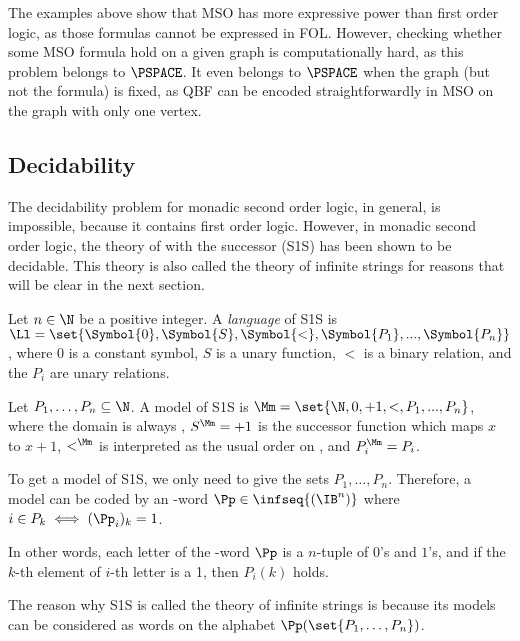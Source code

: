 The examples above show that MSO has more expressive power than first
order logic, as those formulas cannot be expressed in FOL.
However, checking whether some MSO formula hold on a given graph
is computationally hard, as this problem belongs to $\PSPACE$.
It even belongs to $\PSPACE$ when the graph (but not the formula)
is fixed, as \textsc{QBF} can be encoded straightforwardly in MSO
on the graph with only one vertex.

\subsection{Decidability}


The decidability problem for monadic second order logic,
in general, is impossible, because it contains first order logic.
However, in monadic second order logic, the theory of \N with
the successor (S1S) has been shown to be decidable.
This theory is also called the theory of infinite strings
for reasons that will be clear in the next section.

\begin{definition}
    Let $n \in \N$ be a positive integer.
    A \emph{language}  of S1S is $\Ll = \set{\Symbol{0}, \Symbol{S}, \Symbol{<}, \Symbol{P_1}, ..., \Symbol{P_n}}$,
    where $0$ is a constant symbol, $S$ is a unary function,
    $<$ is a binary relation, and the $P_i$ are unary relations.

    Let $P_1, \dots, P_n \subseteq \N$. A model of S1S is
    $\Mm = \set{\N, 0, +1, <, P_1, ..., P_n}$,
    where the domain is always \N, $S^\Mm = +1$ is the successor function
    which maps $x$ to $x+1$, $<^\Mm$ is interpreted as the usual order
    on \N, and $P_i^\Mm = P_i$.

\end{definition}

\begin{remark}
To get a model of S1S, we only need to give the sets $P_1, \dots, P_n$.
Therefore, a model can be coded by an \w-word $\Pp \in \infseq{(\IB^n)}$
where $i \in P_k \iff (\Pp_i)_k = 1$.

In other words, each letter of the \w-word $\Pp$ is a $n$-tuple of
$0$'s and $1$'s, and if the $k$-th element of $i$-th letter is a 1,
then $P_i(k)$ holds.
\end{remark}

The reason why S1S is called the theory of infinite strings
is because its models can be considered as words on the
alphabet $\Pp(\set{P_1, \dots, P_n})$.

